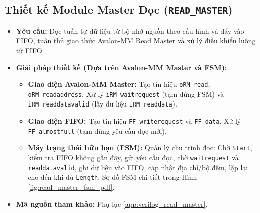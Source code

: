 \subsection{Thiết kế Module Master Đọc (\texttt{READ\_MASTER})}
\begin{itemize}
    \item \textbf{Yêu cầu:} Đọc tuần tự dữ liệu từ bộ nhớ nguồn theo cấu hình và đẩy vào FIFO, tuân thủ giao thức Avalon-MM Read Master và xử lý điều khiển luồng từ FIFO.
    \item \textbf{Giải pháp thiết kế (Dựa trên Avalon-MM Master và FSM):}
        \begin{itemize}
            \item \textbf{Giao diện Avalon-MM Master:} Tạo tín hiệu \texttt{oRM\_read}, \texttt{oRM\_readaddress}. Xử lý \texttt{iRM\_waitrequest} (tạm dừng FSM) và \texttt{iRM\_readdatavalid} (lấy dữ liệu \texttt{iRM\_readdata}).
            \item \textbf{Giao diện FIFO:} Tạo tín hiệu \texttt{FF\_writerequest} và \texttt{FF\_data}. Xử lý \texttt{FF\_almostfull} (tạm dừng yêu cầu đọc mới).
            \item \textbf{Máy trạng thái hữu hạn (FSM):} Quản lý chu trình đọc: Chờ \texttt{Start}, kiểm tra FIFO không gần đầy, gửi yêu cầu đọc, chờ \texttt{waitrequest} và \texttt{readdatavalid}, ghi dữ liệu vào FIFO, cập nhật địa chỉ/bộ đếm, lặp lại cho đến khi đủ \texttt{Length}. Sơ đồ FSM chi tiết trong Hình \ref{fig:read_master_fsm_pdf}.
        \end{itemize}
    \item \textbf{Mã nguồn tham khảo:} Phụ lục \ref{app:verilog_read_master}.
\end{itemize}

